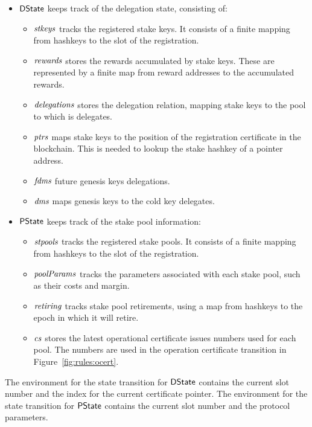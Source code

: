 \begin{itemize}
  \item $\mathsf{DState}$ keeps track of the delegation state, consisting of:
    \begin{itemize}
      \item $\mathit{stkeys}$ tracks the registered stake keys. It consists of a finite
        mapping from hashkeys to the slot of the registration.
      \item $\mathit{rewards}$ stores the rewards accumulated by stake keys.
        These are represented by a finite map from reward addresses to the accumulated rewards.
      \item $\mathit{delegations}$ stores the delegation relation, mapping stake keys to the
        pool to which is delegates.
      \item $\mathit{ptrs}$ maps stake keys to the position of the registration certificate
        in the blockchain. This is needed to lookup the stake hashkey of a pointer address.
      \item $\mathit{fdms}$ future genesis keys delegations.
      \item $\mathit{dms}$ maps genesis keys to the cold key delegates.
    \end{itemize}
  \item $\mathsf{PState}$ keeps track of the stake pool information:
    \begin{itemize}
      \item $\mathit{stpools}$ tracks the registered stake pools. It consists of a finite
        mapping from hashkeys to the slot of the registration.
      \item $\mathit{poolParams}$ tracks the parameters associated with each stake pool, such as
        their costs and margin.
      \item $\mathit{retiring}$ tracks stake pool retirements, using a map from hashkeys to
        the epoch in which it will retire.
      \item $\mathit{cs}$ stores the latest operational certificate issues numbers used for each pool.
        The numbers are used in the operation certificate transition
        in Figure~\ref{fig:rules:ocert}.
    \end{itemize}
\end{itemize}

The environment for the state transition for $\mathsf{DState}$ contains the current slot number
and the index for the current certificate pointer.
The environment for the state transition for $\mathsf{PState}$ contains the current slot number
and the protocol parameters.

